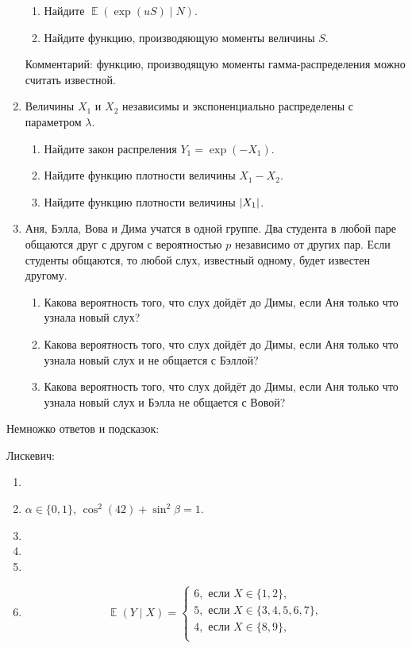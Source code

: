 \documentclass[12pt]{article}
\DeclarePairedDelimiter{\abs}{\lvert}{\rvert}
\DeclareMathOperator{\E}{\mathbb{E}}
\begin{document}
\begin{enumerate}
\begin{enumerate}
    \item Найдите $\E(\exp(u S) \mid N)$.
    \item Найдите функцию, производяющую моменты величины $S$.
\end{enumerate}

Комментарий: функцию, производящую моменты гамма-распределения можно считать известной.

\item Величины $X_1$ и $X_2$ независимы и экспоненциально распределены с параметром $\lambda$. 
\begin{enumerate}
    \item Найдите закон распреления $Y_1 = \exp(-X_1)$.
    \item Найдите функцию плотности величины $X_1 - X_2$.
    \item Найдите функцию плотности величины $\abs{X_1}$.
\end{enumerate}


\item Аня, Бэлла, Вова и Дима учатся в одной группе. 
Два студента в любой паре общаются друг с другом с вероятностью $p$ независимо от других пар.
Если студенты общаются, то любой слух, известный одному, будет известен другому. 
\begin{enumerate}
    \item Какова вероятность того, что слух дойдёт до Димы, если Аня только что узнала новый слух?
    \item Какова вероятность того, что слух дойдёт до Димы, если Аня только что узнала новый слух и не общается с Бэллой?
    \item Какова вероятность того, что слух дойдёт до Димы, если Аня только что узнала новый слух и Бэлла не общается с Вовой?
\end{enumerate}

\end{enumerate}


Немножко ответов и подсказок:



Лискевич:
\begin{enumerate}
    \item 
    \item $\alpha \in \{0, 1\}$, $\cos^2(42) + \sin^2\beta = 1$.
    \item 
    \item 
    \item 
    \item 
\[
\E(Y \mid X) = \begin{cases}
    6, \text{ если } X \in \{1, 2\},\\
    5, \text{ если } X \in \{3, 4, 5, 6, 7\},\\
    4, \text{ если } X \in \{8, 9\},\\
\end{cases}
\]
\end{enumerate}
\end{document}
